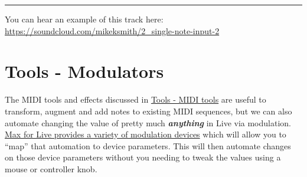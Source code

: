 \documentclass[
  12pt,
  letterpaper,
  oneside,
  open=any]{scrbook}
\begin{document}
\begin{center}\rule{0.5\linewidth}{0.5pt}\end{center}

You can hear an example of this track here:
\url{https://soundcloud.com/mikeksmith/2_single-note-input-2}


\chapter{Tools - Modulators}\label{Chapter-007-Tools-Modulators}

The MIDI tools and effects discussed in
\hyperref[Chapter-004-Tools-MIDI_tools]{Tools - MIDI tools} are useful
to transform, augment and add notes to existing MIDI sequences, but we
can also automate changing the value of pretty much
\textbf{\emph{anything}} in Live via modulation.
\href{https://www.ableton.com/en/live-manual/11/max-for-live-devices/\#max-for-live-audio-effects}{Max
for Live provides a variety of modulation devices} which will allow you
to ``map'' that automation to device parameters. This will then automate
changes on those device parameters without you needing to tweak the
values using a mouse or controller knob.
\end{document}
